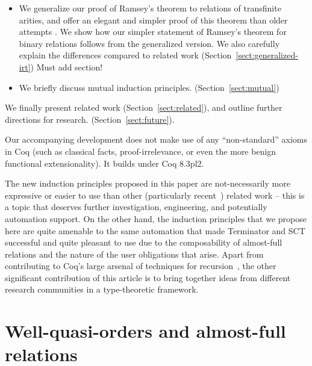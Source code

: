 \documentclass{llncs}
\newcommand{\dv}[1]{{\color{red}{\bf DV:} #1}}
\begin{document}
\begin{itemize}
  \item We generalize our proof of Ramsey's theorem to relations of transfinite arities, and offer an elegant and simpler proof of this theorem
        than older attempts \cite{Coquand:1994:ART:185268.185270,Fridlender97higmanslemma}. We show how our simpler statement of Ramsey's theorem
        for binary relations follows from the generalized version. We also carefully explain the differences compared to related work 
       (Section~\ref{sect:generalized-irt}) \dv{Must add section!}

 \item We briefly discuss mutual induction principles. (Section~\ref{sect:mutual})

\end{itemize}

We finally present related work (Section~\ref{sect:related}), and outline 
further directions for research. (Section~\ref{sect:future}).

Our accompanying development does not make use of any ``non-standard'' axioms 
in Coq (such as classical facts, proof-irrelevance, or even the more benign functional extensionality). 
It builds under Coq 8.3pl2. 

The new induction principles proposed in this paper
are not-necessarily more expressive or easier to use than 
other (particularly recent~\cite{chargueraud-10-fix,kraus+:fix,sozeau-rewrite}) related work -- this 
is a topic that deserves further investigation, engineering, and potentially automation 
support. On the other hand,  the induction principles that we propose here are 
quite amenable to the same automation that made Terminator and SCT successful and quite pleasant to use due to 
the composability of almost-full relations and the nature of the user obligations that arise. Apart from contributing to Coq's large arsenal
of 
techniques for recursion~\cite{coqart,bove-capretta,Megacz:coinductive-monad,sozeau-rewrite,chargueraud-10-fix}, the 
other significant contribution of this article is to bring together ideas from different research communities 
in a type-theoretic framework. 

\section{Well-quasi-orders and almost-full relations}\label{sect:af}
\end{document}
